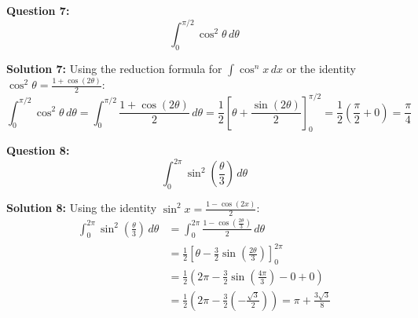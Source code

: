 \documentclass{article}
\begin{document}
\bigskip

\textbf{Question 7:}
\[ \int_0^{\pi/2} \cos^2 \theta \, d\theta \]

\textbf{Solution 7:}
Using the reduction formula for $\int \cos^n x \, dx$ or the identity $\cos^2 \theta = \frac{1 + \cos(2\theta)}{2}$:
\[ \int_0^{\pi/2} \cos^2 \theta \, d\theta = \int_0^{\pi/2} \frac{1 + \cos(2\theta)}{2} \, d\theta = \frac{1}{2} \left[ \theta + \frac{\sin(2\theta)}{2} \right]_0^{\pi/2} = \frac{1}{2} \left( \frac{\pi}{2} + 0 \right) = \frac{\pi}{4} \]

\bigskip

\textbf{Question 8:}
\[ \int_0^{2\pi} \sin^2 \left( \frac{\theta}{3} \right) \, d\theta \]

\textbf{Solution 8:}
Using the identity $\sin^2 x = \frac{1 - \cos(2x)}{2}$:
\begin{align*} \int_0^{2\pi} \sin^2 \left( \frac{\theta}{3} \right) \, d\theta &= \int_0^{2\pi} \frac{1 - \cos \left( \frac{2\theta}{3} \right)}{2} \, d\theta \\ &= \frac{1}{2} \left[ \theta - \frac{3}{2} \sin \left( \frac{2\theta}{3} \right) \right]_0^{2\pi} \\ &= \frac{1}{2} \left( 2\pi - \frac{3}{2} \sin \left( \frac{4\pi}{3} \right) - 0 + 0 \right) \\ &= \frac{1}{2} \left( 2\pi - \frac{3}{2} \left( -\frac{\sqrt{3}}{2} \right) \right) = \pi + \frac{3\sqrt{3}}{8} \end{align*} 
\end{document}
